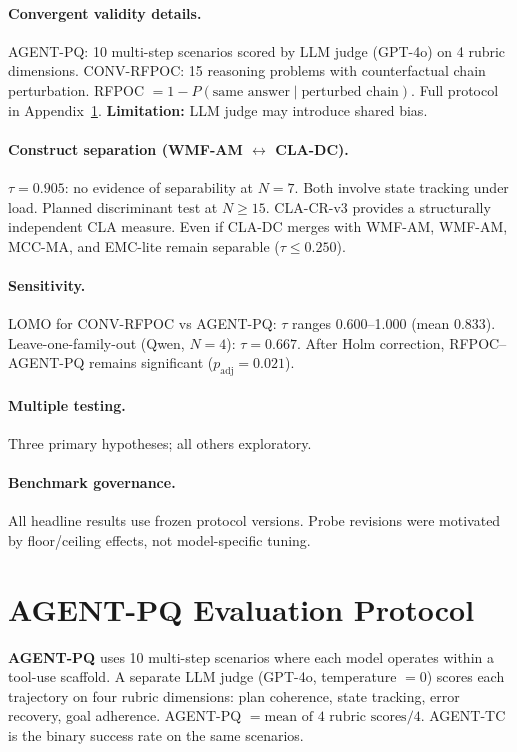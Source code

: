 \documentclass{article}
\begin{document}
\paragraph{Convergent validity details.}
AGENT-PQ: 10 multi-step scenarios scored by LLM judge (GPT-4o) on
4 rubric dimensions. CONV-RFPOC: 15 reasoning problems with
counterfactual chain perturbation. RFPOC $= 1 - P(\text{same answer}
\mid \text{perturbed chain})$. Full protocol in
Appendix~\ref{app:agentpq}.
\textbf{Limitation:} LLM judge may introduce shared bias.

\paragraph{Construct separation (WMF-AM $\leftrightarrow$ CLA-DC).}
$\tau = 0.905$: no evidence of separability at $N{=}7$. Both involve
state tracking under load. Planned discriminant test at $N \geq 15$.
CLA-CR-v3 provides a structurally independent CLA measure.
Even if CLA-DC merges with WMF-AM, WMF-AM, MCC-MA, and EMC-lite
remain separable ($\tau \leq 0.250$).

\paragraph{Sensitivity.}
LOMO for CONV-RFPOC vs AGENT-PQ: $\tau$ ranges 0.600--1.000
(mean 0.833). Leave-one-family-out (Qwen, $N{=}4$): $\tau = 0.667$.
After Holm correction, RFPOC--AGENT-PQ remains significant
($p_\text{adj} = 0.021$).

\paragraph{Multiple testing.}
Three primary hypotheses; all others exploratory.

\paragraph{Benchmark governance.}
All headline results use frozen protocol versions. Probe revisions were
motivated by floor/ceiling effects, not model-specific tuning.

\section{AGENT-PQ Evaluation Protocol}
\label{app:agentpq}

\textbf{AGENT-PQ} uses 10 multi-step scenarios where each model operates
within a tool-use scaffold. A separate LLM judge (GPT-4o, temperature
$= 0$) scores each trajectory on four rubric dimensions:
plan coherence, state tracking, error recovery, goal adherence.
AGENT-PQ $= \text{mean of 4 rubric scores} / 4$.
AGENT-TC is the binary success rate on the same scenarios.
\end{document}
